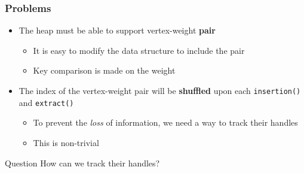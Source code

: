 \documentclass{beamer}
\begin{document}
\begin{frame}
	\frametitle{Problems}
	\begin{itemize}
		\item The heap must be able to support vertex-weight \textbf{pair} 
		\begin{itemize}
			\item It is easy to modify the data structure to include the pair
			\item Key comparison is made on the weight 
		\end{itemize}
		\item The index of the vertex-weight pair will be \textbf{shuffled} upon each \texttt{insertion()} and \texttt{extract()} 
		\begin{itemize}
			\item To prevent the \emph{loss} of information, we need a way to track their handles
			\item This is non-trivial
		\end{itemize}
	\end{itemize}
	 \begin{block}{Question}
		How can we track their handles?
	\end{block}
\end{frame}
\end{document}
